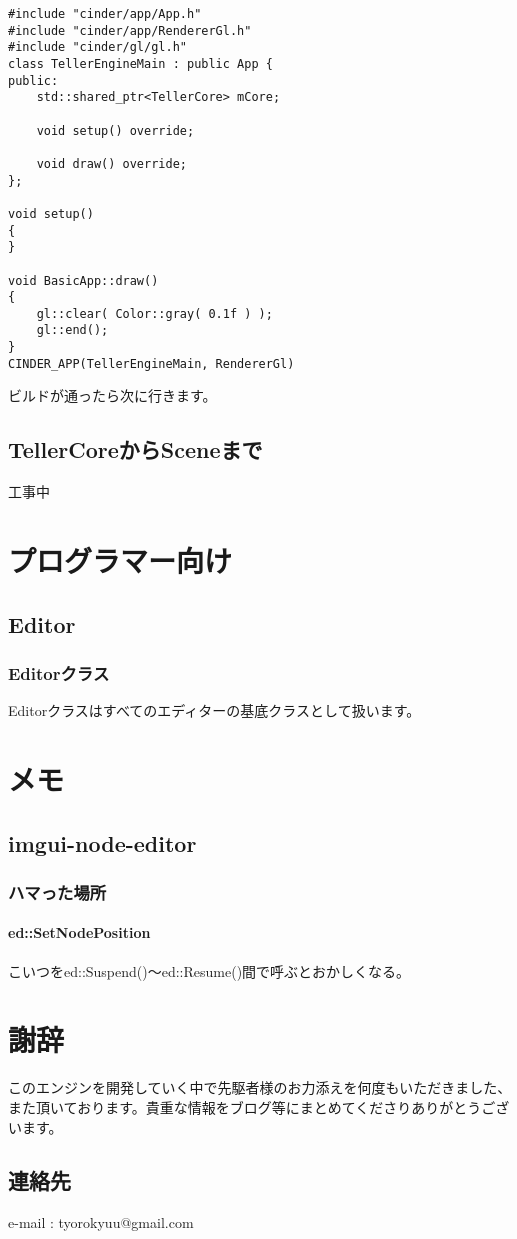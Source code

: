 \documentclass[12pt,a4paper,uplatex,dvipdfmx]{jsarticle}
\begin{document}
\begin{lstlisting}[caption=hoge,label=fuga]
#include "cinder/app/App.h"
#include "cinder/app/RendererGl.h"
#include "cinder/gl/gl.h"
class TellerEngineMain : public App {
public:
	std::shared_ptr<TellerCore> mCore;

	void setup() override;

	void draw() override;
};

void setup()
{
}

void BasicApp::draw()
{
	gl::clear( Color::gray( 0.1f ) );
	gl::end();
}
CINDER_APP(TellerEngineMain, RendererGl)
\end{lstlisting}

ビルドが通ったら次に行きます。
\subsection{TellerCoreからSceneまで}

\Large{工事中}
\normalsize

\section{プログラマー向け}
\subsection{Editor}
\subsubsection{Editorクラス}
Editorクラスはすべてのエディターの基底クラスとして扱います。

\section{メモ}
\subsection{imgui-node-editor}
\subsubsection{ハマった場所}
\paragraph{ed::SetNodePosition}
こいつをed::Suspend()～ed::Resume()間で呼ぶとおかしくなる。


\newpage
\appendix
\section*{謝辞}
このエンジンを開発していく中で先駆者様のお力添えを何度もいただきました、また頂いております。貴重な情報をブログ等にまとめてくださりありがとうございます。

\subsection*{連絡先}
e-mail : tyorokyuu@gmail.com
\end{document}
